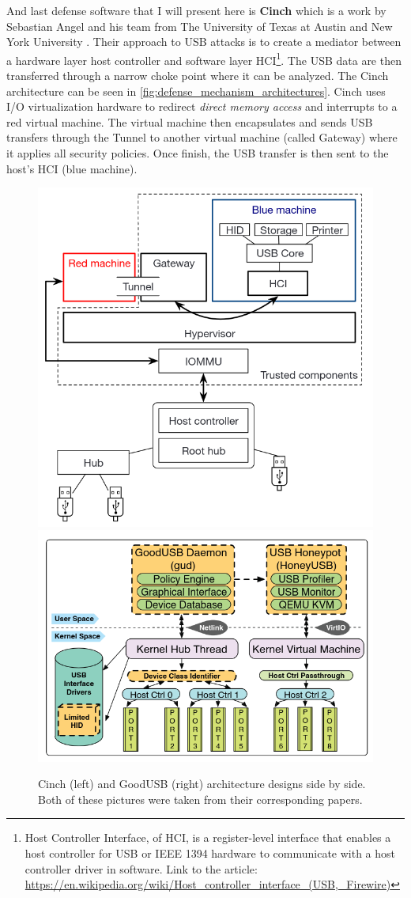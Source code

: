 And last defense software that I will present here is \textbf{Cinch} which is a work by Sebastian Angel and his team from The University of Texas at Austin and New York University \cite{197175}. Their approach to USB attacks is to create a mediator between a hardware layer host controller and software layer HCI\footnote{Host Controller Interface, of HCI, is a register-level interface that enables a host controller for USB or IEEE 1394 hardware to communicate with a host controller driver in software. Link to the article: \url{https://en.wikipedia.org/wiki/Host_controller_interface_(USB,_Firewire)}}. The USB data are then transferred through a narrow choke point where it can be analyzed. The Cinch architecture can be seen in \autoref{fig:defense_mechanism_architectures}. Cinch uses I/O virtualization hardware to redirect \emph{direct memory access} and interrupts to a red virtual machine. The virtual machine then encapsulates and sends USB transfers through the Tunnel to another virtual machine (called Gateway) where it applies all security policies. Once finish, the USB transfer is then sent to the host's HCI (blue machine).
\begin{figure}[ht]
    \centering
    \includegraphics[width=0.4\linewidth]{./obrazky-figures/cinch_arch.png}
    \includegraphics[width=0.4\linewidth]{./obrazky-figures/goodusb_arch.png}
    \caption{Cinch (left) and GoodUSB (right) architecture designs side by side. Both of these pictures were taken from their corresponding papers.}
    \label{fig:defense_mechanism_architectures}
\end{figure}

